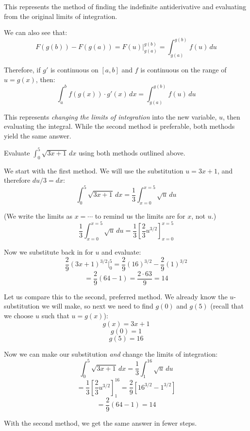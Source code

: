 This represents the method of finding the indefinite antiderivative and 
evaluating from the original limits of integration. 

We can also see that:
$$F(g(b)) - F(g(a)) = F(u)|_{g(a)}^{g(b)} = \int_{g(a)}^{g(b)} f(u)\,du$$

Therefore, if $g'$ is continuous on $\left[ a, b \right]$ and $f$ is continuous 
on the range of $u = g(x)$, then:
$$\int_a^b f(g(x)) \cdot g'(x)\,dx = \int_{g(a)}^{g(b)} f(u)\,du$$

This represents \emph{changing the limits of integration} into the new variable, $u$, 
then evaluating the integral. While the second method is preferable, both 
methods yield the same answer. 

\begin{Worked}
\begin{Problem}
Evaluate $\int_0^{5} \sqrt{3x + 1}\,dx$ using both methods 
outlined above.
\end{Problem}
\begin{Solution}
We start with the first method. We will use the substitution 
$u = 3x + 1$, and therefore $du/3 = dx$:
$$\int_0^5 \sqrt{3x + 1}\,dx = \frac{1}{3} \int_{x = 0}^{x = 5} \sqrt{u}\,du$$

(We write the limits as $x = \cdots$ to remind us the limits are for $x$, not 
$u$.)
$$\frac{1}{3} \int_{x = 0}^{x = 5} \sqrt{u}\,du = \frac{1}{3} \left[ \frac{2}{3} 
u^{3/2} \right]_{x = 0}^{x = 5}$$

Now we substitute back in for $u$ and evaluate:
$$\frac{2}{9} \left( 3x + 1 \right)^{3/2}|_{0}^{5} = \frac{2}{9} \left( 16 
\right)^{3/2} - \frac{2}{9} \left( 1 \right)^{3/2}$$
$$= \frac{2}{9} \left( 64 - 1 \right) = \frac{2 \cdot 63}{9} = 14$$

Let us compare this to the second, preferred method. We already know the 
$u$-substitution we will make, so next we need to find $g(0)$ and $g(5)$ (recall 
that we choose $u$ such that $u = g(x)$):
$$g(x) = 3x + 1$$
$$g(0) = 1$$
$$g(5) = 16$$

Now we can make our substitution \textit{and} change the limits of integration:
$$\int_0^5 \sqrt{3x + 1}\,dx = \frac{1}{3} \int_1^{16} \sqrt{u}\,du$$
$$= \frac{1}{3} \left[ \frac{2}{3} u^{3/2} \right]_1^{16} = \frac{2}{9} \left[ 
16^{3/2} - 1^{3/2} \right]$$
$$= \frac{2}{9} \left(64 - 1 \right) = 14$$

With the second method, we get the same answer in fewer steps.
\end{Solution}
\end{Worked}

